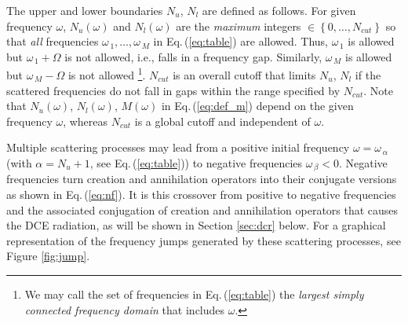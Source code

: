 %
The upper and lower boundaries $N_u$, $N_l$ are  defined as follows. 
For given frequency $\omega$, $N_u(\omega)$ and $N_l(\omega)$
are the {\em maximum} integers $\in \left\{0, \ldots, N_{cut} \right\}$ so that {\em all} frequencies
$\omega_{\,1}, \ldots, \omega_{\,M}$ in Eq.\,(\ref{eq:table}) are allowed. 
Thus, $\omega_{\,1}$ is allowed but $\omega_{\,1} + \Omega$ 
is not allowed, i.e., falls in a frequency gap. Similarly,
$\omega_{\,M}$ is allowed but $\omega_{\,M} - \Omega$ is not allowed
%
\footnote{We may call the set of frequencies in Eq.\,(\ref{eq:table}) the {\em largest 
simply connected frequency domain} that includes $\omega$.}.
%
$N_{cut}$ is an overall cutoff that limits $N_u$, $N_l$ if the scattered frequencies 
do not fall in gaps within the range specified by $N_{cut}$. 
Note that $N_u(\omega)$, $N_l(\omega)$, $M(\omega)$ in Eq.\,(\ref{eq:def_m}) 
depend on the given frequency $\omega$, whereas $N_{cut}$ is a global cutoff 
and independent of $\omega$. 

Multiple scattering processes may lead from a positive initial frequency 
$\omega = \omega_{\,\alpha}$ (with $\alpha = N_u + 1$, see Eq.\,(\ref{eq:table}))
to negative frequencies $\omega_{\,\beta} < 0$. 
Negative frequencies turn creation and annihilation operators into their conjugate 
versions as shown in Eq.\,(\ref{eq:nf}). It is this crossover from positive to 
negative frequencies and the associated conjugation of 
creation and annihilation operators that causes the DCE radiation, 
as will be shown in Section \ref{sec:dcr} below. For a graphical representation 
of the frequency jumps generated by these scattering processes, see Figure \ref{fig:jump}.
%

